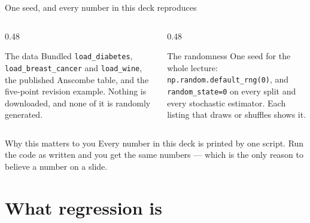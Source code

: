 \documentclass[aspectratio=169]{beamer}
\begin{document}
\begin{frame}{One seed, and every number in this deck reproduces}
  \begin{columns}[T]
    \begin{column}{0.48\textwidth}
      \begin{block}{The data}
        \small Bundled \texttt{load\_diabetes},
        \texttt{load\_breast\_cancer} and \texttt{load\_wine}, the published
        Anscombe table, and the five-point revision example. Nothing is
        downloaded, and none of it is randomly generated.
      \end{block}
    \end{column}
    \begin{column}{0.48\textwidth}
      \begin{block}{The randomness}
        \small One seed for the whole lecture:
        \texttt{np.random.default\_rng(0)}, and \texttt{random\_state=0} on
        every split and every stochastic estimator. Each listing that draws or
        shuffles shows it.
      \end{block}
    \end{column}
  \end{columns}
  \vspace{0.5em}
  \begin{exampleblock}{Why this matters to you}
    \centering\small
    Every number in this deck is printed by one script. Run the code as
    written and you get the same numbers --- which is the only reason to
    believe a number on a slide.
  \end{exampleblock}
\end{frame}

\section[Regression]{What regression is}
\label{sec:intro}
\end{document}
